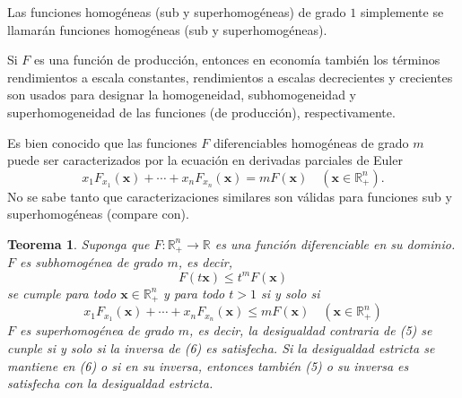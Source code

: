 \documentclass[a4paper,fleqn]{cas-dc}
\newtheorem{theorem}{Teorema}
\begin{document}
Las funciones homogéneas (sub y superhomogéneas) de grado $1$ simplemente se llamarán funciones homogéneas (sub y superhomogéneas).

Si $F$ es una función de producción, entonces en economía también los términos rendimientos a escala constantes, rendimientos a escalas decrecientes y crecientes son usados para designar la homogeneidad, subhomogeneidad y superhomogeneidad de las funciones (de producción), respectivamente.

Es bien conocido que las funciones $F$ diferenciables homogéneas de grado $m$ puede ser caracterizados por la ecuación en derivadas parciales de Euler \[ x_{1}F_{x_{1}}\left(\bm{x}\right)+\cdots+x_{n}F_{x_{n}}\left(\bm{x}\right)=mF\left(\bm{x}\right)\quad\left(\bm{x}\in\mathds{R}^{n}_{+}\right). \]
No se sabe tanto que caracterizaciones similares son válidas para funciones sub y superhomogéneas (compare con).

\begin{theorem}
Suponga que $F\colon\mathds{R}^{n}_{+}\rightarrow\mathds{R}$ es una función diferenciable en su dominio. $F$ es subhomogénea de grado $m$, es decir,
\begin{equation}
F\left(t\bm{x}\right)\leq t^{m}F\left(\bm{x}\right)
\end{equation}
se cumple para todo $\bm{x}\in\mathds{R}^{n}_{+}$ y para todo $t>1$ si y solo si
\begin{equation}
x_{1}F_{x_{1}}\left(\bm{x}\right)+\cdots+x_{n}F_{x_{n}}\left(\bm{x}\right)\leq mF\left(\bm{x}\right)\quad\left(\bm{x}\in\mathds{R}^{n}_{+}\right)
\end{equation}
$F$ es superhomogénea de grado $m$, es decir, la desigualdad contraria de (5) se cunple si y solo si la inversa de (6) es satisfecha.
Si la desigualdad estricta se mantiene en (6) o si en su inversa, entonces también (5) o su inversa es satisfecha con la desigualdad estricta.
\end{theorem}
\end{document}
